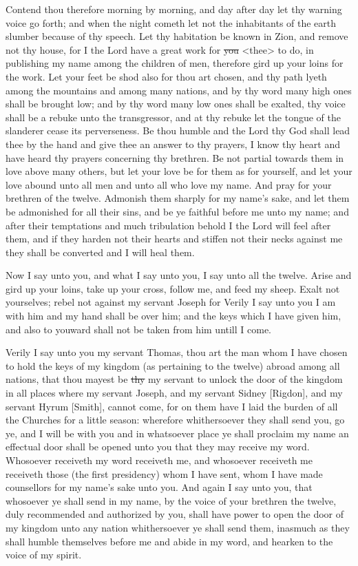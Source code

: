 					Contend thou therefore morning by morning, and day after day let thy warning voice go forth; and when the night cometh let not the inhabitants of the earth slumber because of thy speech. Let thy habitation be known in Zion, and remove not thy house, for I the Lord have a great work for \sout{you} <thee> to do, in publishing my name among the children of men, therefore gird up your loins for the work. Let your feet be shod also for thou art chosen, and thy path lyeth among the mountains and among many nations, and by thy word many high ones shall be brought low; and by thy word many low ones shall be exalted, thy voice shall be a rebuke unto the transgressor, and at thy rebuke let the tongue of the slanderer cease its perverseness. Be thou humble and the Lord thy God shall lead thee by the hand and give thee an answer to thy prayers, I know thy heart and have heard thy prayers concerning thy brethren. Be not partial towards them in love above many others, but let your love be for them as for yourself, and let your love abound unto all men and unto all who love my name. And pray for your brethren of the twelve. Admonish them sharply for my name's sake, and let them be admonished for all their sins, and be ye faithful before me unto my name; and after their temptations and much tribulation behold I the Lord will feel after them, and if they harden not their hearts and stiffen not their necks against me they shall be converted and I will heal them.

					Now I say unto you, and what I say unto you, I say unto all the twelve. Arise and gird up your loins, take up your cross, follow me, and feed my sheep. Exalt not yourselves; rebel not against my servant Joseph for Verily I say unto you I am with him and my hand shall be over him; and the keys which I have given him, and also to youward shall not be taken from him untill I come.

					Verily I say unto you my servant Thomas, thou art the man whom I have chosen to hold the keys of my kingdom (as pertaining to the twelve) abroad among all nations, that thou mayest be \sout{thy} my servant to unlock the door of the kingdom in all places where my servant Joseph, and my servant Sidney [Rigdon], and my servant Hyrum [Smith], cannot come, for on them have I laid the burden of all the Churches for a little season: wherefore whithersoever they shall send you, go ye, and I will be with you and in whatsoever place ye shall proclaim my name an effectual door shall be opened unto you that they may receive my word. Whosoever receiveth my word receiveth me, and whosoever receiveth me receiveth those (the first presidency) whom I have sent, whom I have made counsellors for my name's sake unto you. And again I say unto you, that whosoever ye shall send in my name, by the voice of your brethren the twelve, duly recommended and authorized by you, shall have power to open the door of my kingdom unto any nation whithersoever ye shall send them, inasmuch as they shall humble themselves before me and abide in my word, and hearken to the voice of my spirit.

